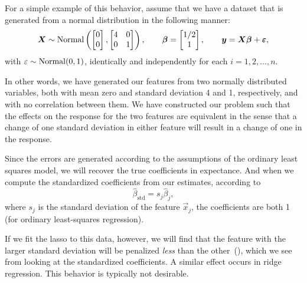 For a simple example of this behavior, assume that we have a dataset that is generated from a normal distribution in the following manner:
\[
  \boldsymbol{X} \sim \operatorname{Normal}\left(\begin{bmatrix}0 \\ 0\end{bmatrix}, \begin{bmatrix} 4 & 0 \\ 0 & 1\end{bmatrix}\right), \qquad \boldsymbol{\beta} = \begin{bmatrix} 1/2 \\ 1 \end{bmatrix}, \qquad \boldsymbol{y} = \boldsymbol{X}\boldsymbol{\beta} + \boldsymbol{\varepsilon},
\]
with \(\varepsilon \sim \operatorname{Normal}(0,1)\), identically and independently for each \(i = 1,2,\dots,n\).

In other words, we have generated our features from two normally distributed variables, both with mean zero and standard deviation 4 and 1, respectively, and with no correlation between them. We have constructed our problem such that the effects on the response for the two features are equivalent in the sense that a change of one standard deviation in either feature will result in a change of one in the response.

Since the errors are generated according to the assumptions of the ordinary least squares model, we will recover the true coefficients in expectance. And when we compute the standardized coefficients from our estimates, according to
\[
  \hat{\beta}_\text{std} = s_j\hat{\beta}_j,
\]
where \(s_j\) is the standard deviation of the feature \(\vec{x}_j\), the coefficients are both 1 (for ordinary least-squares regression).

If we fit the lasso to this data, however, we will find that the feature with the larger standard deviation will be penalized \emph{less} than the other~(), which we see from looking at the standardized coefficients. A similar effect occurs in ridge regression. This behavior is typically not desirable.

